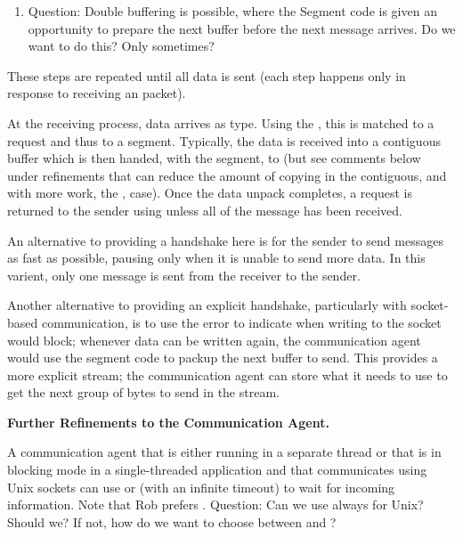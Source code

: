 \begin{mmadi}
\begin{tcp}
\begin{enumerate}
\item Question:  Double buffering is possible, where the Segment code is given
  an opportunity to prepare the next buffer before the next
   message arrives.  Do we want to do this?
  Only sometimes?

\end{enumerate}
These steps are repeated until all data is sent (each step happens only in
response to receiving an  packet).

At the receiving process, data arrives as  type.  
Using the , this is matched to a request
and thus to a segment.  Typically, the data is received into a contiguous
buffer which is then handed, with the segment, to  
(but see comments below under refinements that can reduce the amount of
copying in the contiguous, and with more work, the , case).
Once the data unpack completes, a  request is
returned to the sender using  unless all of the message
has been received.

An alternative to providing a handshake here is for the sender to send
 messages as fast as possible, pausing only when it
is unable to send more data.  In this varient, only one
 message is sent from the receiver to the
sender. 

Another alternative to providing an explicit handshake, particularly with
socket-based communication, is to use the  error to indicate when
writing to the socket would block; whenever data can be written again, the
communication agent would use the segment code to packup the next buffer to
send.  This provides a more explicit stream; the communication agent can store
what it needs to use to get the next group of bytes to send in the stream.

\textbf{Further Refinements to the Communication Agent.}

A communication agent that is either running in a separate thread or that is
in blocking mode in a single-threaded application and that communicates using
Unix sockets can use  or  (with an infinite timeout)
to wait for incoming information.  Note that Rob prefers .
Question: Can we use  always for Unix?  Should we?  If not, how do
we want to choose between  and ?


\end{tcp}
\end{mmadi}
